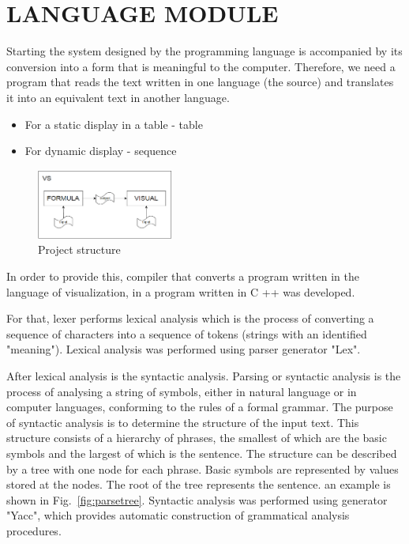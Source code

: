 \documentclass[a4paper, 10pt, conference]{ieeeconf}
\begin{document}
\section{LANGUAGE MODULE}
Starting the system designed by the programming language is accompanied by its conversion into a form that is meaningful to the computer. Therefore, we need a program that reads the text written in one language (the source) and translates it into an equivalent text in another language.
\begin{itemize}
\item For a static display in a table - table
\item For dynamic display - sequence
\end{itemize}
\begin{figure}[h]
    \centering
    \includegraphics[width=0.4\textwidth]{structure.png}
    \caption{Project structure}
    \label{fig:structure}
\end{figure}

In order to provide this, compiler that converts a program written in the language of visualization, in a program written in C ++ was developed.

For that, lexer performs lexical analysis which is the process of converting a sequence of characters  into a sequence of tokens (strings with an identified "meaning"). Lexical analysis was performed using parser generator "Lex".

After lexical analysis is the syntactic analysis. Parsing or syntactic analysis is the process of analysing a string of symbols, either in natural language or in computer languages, conforming to the rules of a formal grammar. The purpose of syntactic analysis is to determine the structure of the input text. This structure consists of a hierarchy of phrases, the smallest of which are the basic symbols and the largest of which is the sentence\cite{c1}. The structure can be described by a tree with one node for each phrase. Basic symbols are represented by values stored at the nodes. The root of the tree represents the sentence. an example is shown in Fig.~\ref{fig:parsetree}. Syntactic analysis was performed using generator "Yacc", which provides automatic construction of grammatical analysis procedures.
\end{document}
